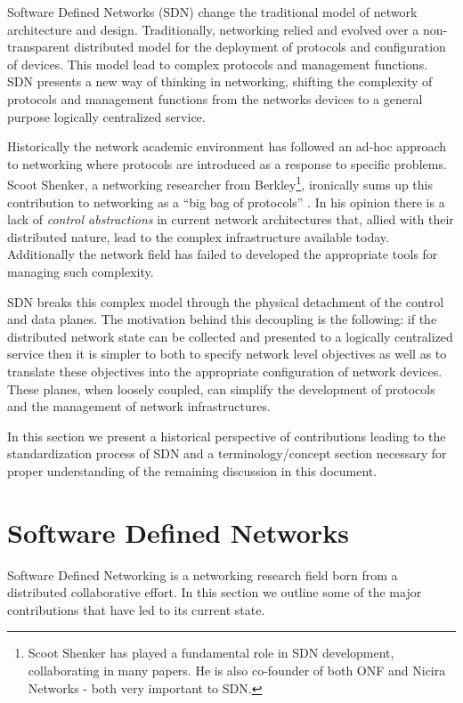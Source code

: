 
Software Defined Networks (SDN) change the traditional model of network
architecture and design. Traditionally,  networking  relied and evolved over a non-transparent distributed model for
the deployment  of  protocols and configuration of devices. This model
lead to complex protocols and management functions. SDN presents a new way of thinking in networking,
shifting the complexity of protocols and management functions from  the  networks
devices to a general purpose logically centralized service. 

Historically  the network academic environment has followed an 
ad-hoc approach to networking where protocols are introduced as a
response to specific problems. Scoot
Shenker, a networking researcher from Berkley\footnote{Scoot Shenker has played a fundamental role in SDN development, collaborating in many papers. He is also co-founder of both ONF \cite{onf} and Nicira Networks - both very important to SDN.}, ironically sums up  this contribution to networking as a ``big bag of
protocols'' \cite{Shenker:2011ys}. In his opinion there is a lack of
\emph{control abstractions} in current network architectures that, allied  with  their  distributed nature,
lead to the  complex infrastructure available today. Additionally the
network field has failed to developed the appropriate tools for
managing such complexity. 

SDN breaks this complex model through the
physical detachment of the control and data planes.  The motivation behind this
decoupling is the following: if the distributed network state can be collected
and presented to a logically centralized service then it is simpler to both to
specify network level objectives as well as to translate these
objectives into the appropriate configuration of network devices. These
planes, when loosely coupled, can simplify the development of protocols
and the management of network infrastructures. 

In this section we present a historical perspective
of contributions leading to the standardization process of SDN and a
terminology/concept section necessary for
proper understanding of the remaining discussion in this document.  


\section{Software Defined Networks}
\glsresetall
\label{sec:background:sdn}
Software Defined Networking is a networking research field born from a  distributed
collaborative effort. In this section we
outline some of the major contributions that have
led to its current state. 

